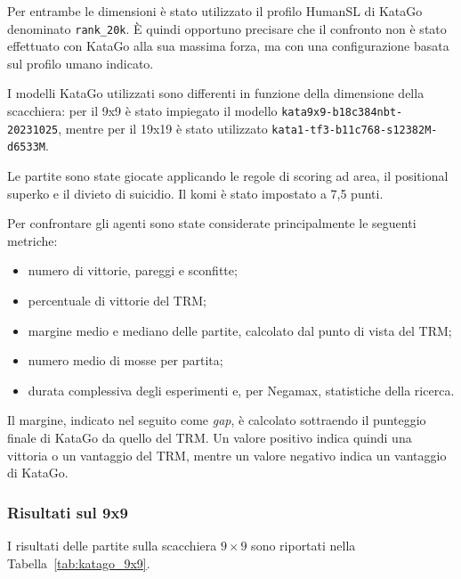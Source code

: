 Per entrambe le dimensioni è stato utilizzato il profilo HumanSL di KataGo denominato \texttt{rank\_20k}. È quindi opportuno precisare che il confronto non è stato effettuato con KataGo alla sua massima forza, ma con una configurazione basata sul profilo umano indicato.

I modelli KataGo utilizzati sono differenti in funzione della dimensione della scacchiera: per il 9x9 è stato impiegato il modello \texttt{kata9x9-b18c384nbt-20231025}, mentre per il 19x19 è stato utilizzato \texttt{kata1-tf3-b11c768-s12382M-d6533M}.

Le partite sono state giocate applicando le regole di scoring ad area, il positional superko e il divieto di suicidio. Il komi è stato impostato a 7,5 punti.

Per confrontare gli agenti sono state considerate principalmente le seguenti metriche:
\begin{itemize}
    \item numero di vittorie, pareggi e sconfitte;
    \item percentuale di vittorie del TRM;
    \item margine medio e mediano delle partite, calcolato dal punto di vista del TRM;
    \item numero medio di mosse per partita;
    \item durata complessiva degli esperimenti e, per Negamax, statistiche della ricerca.
\end{itemize}

Il margine, indicato nel seguito come \textit{gap}, è calcolato sottraendo il punteggio finale di KataGo da quello del TRM. Un valore positivo indica quindi una vittoria o un vantaggio del TRM, mentre un valore negativo indica un vantaggio di KataGo.

\subsubsection{Risultati sul 9x9}

I risultati delle partite sulla scacchiera $9 \times 9$ sono riportati nella Tabella~\ref{tab:katago_9x9}.

